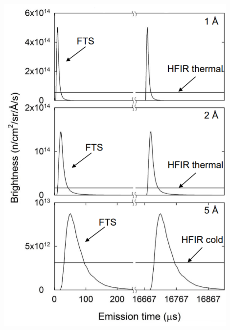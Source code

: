 \documentclass[xcolor=x11names, compress, handout]{beamer}
\renewcommand{\(}{\begin{columns}}
\renewcommand{\)}{\end{columns}}
\newcommand{\<}[1]{\begin{column}{#1}}
\renewcommand{\>}{\end{column}}
\begin{document}
\begin{frame}
\begin{columns}
  \begin{column}{0.5\textwidth}  %
  \begin{center}
  \includegraphics[width=0.9\textwidth]{images/reactor_SNS_pulses.png}
  \end{center}
  \end{column}
  \end{columns}

\end{frame}
\end{document}
